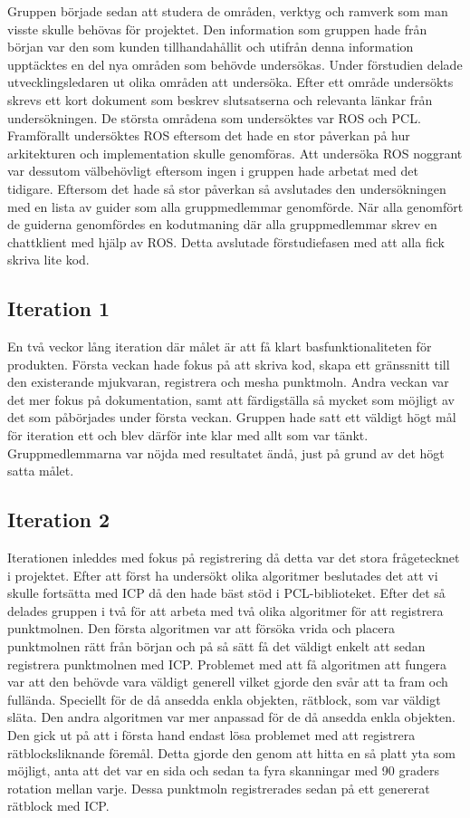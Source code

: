 Gruppen började sedan att studera de områden, verktyg och ramverk som man visste skulle behövas för projektet. Den information som gruppen hade från början var den som kunden tillhandahållit och utifrån denna information upptäcktes en del nya områden som behövde undersökas. Under förstudien delade utvecklingsledaren ut olika områden att undersöka. Efter ett område undersökts skrevs ett kort dokument som beskrev slutsatserna och relevanta länkar från undersökningen. De största områdena som undersöktes var ROS och PCL. Framförallt undersöktes ROS eftersom det hade en stor påverkan på hur arkitekturen och implementation skulle genomföras. Att undersöka ROS noggrant var dessutom välbehövligt eftersom ingen i gruppen hade arbetat med det tidigare. Eftersom det hade så stor påverkan så avslutades den undersökningen med en lista av guider som alla gruppmedlemmar genomförde. När alla genomfört de guiderna genomfördes en kodutmaning där alla gruppmedlemmar skrev en chattklient med hjälp av ROS. Detta avslutade förstudiefasen med att alla fick skriva lite kod.

\subsection{Iteration 1}

En två veckor lång iteration där målet är att få klart basfunktionaliteten för produkten. Första veckan hade fokus på att skriva kod, skapa ett gränssnitt till den existerande mjukvaran, registrera och mesha punktmoln. Andra veckan var det mer fokus på dokumentation, samt att färdigställa så mycket som möjligt av det som påbörjades under första veckan. Gruppen hade satt ett väldigt högt mål för iteration ett och blev därför inte klar med allt som var tänkt. Gruppmedlemmarna var nöjda med resultatet ändå, just på grund av det högt satta målet.

\subsection{Iteration 2}

Iterationen inleddes med fokus på registrering då detta var det stora frågetecknet i projektet. Efter att först ha undersökt olika algoritmer beslutades det att vi skulle fortsätta med ICP då den hade bäst stöd i PCL-biblioteket. Efter det så delades gruppen i två för att arbeta med två olika algoritmer för att registrera punktmolnen. Den första algoritmen var att försöka vrida och placera punktmolnen rätt från början och på så sätt få det väldigt enkelt att sedan registrera punktmolnen med ICP. Problemet med att få algoritmen att fungera var att den behövde vara väldigt generell vilket gjorde den svår att ta fram och fullända. Speciellt för de då ansedda enkla objekten, rätblock, som var väldigt släta. Den andra algoritmen var mer anpassad för de då ansedda enkla objekten. Den gick ut på att i första hand endast lösa problemet med att registrera rätblocksliknande föremål. Detta gjorde den genom att hitta en så platt yta som möjligt, anta att det var en sida och sedan ta fyra skanningar med 90 graders rotation mellan varje. Dessa punktmoln registrerades sedan på ett genererat rätblock med ICP.

